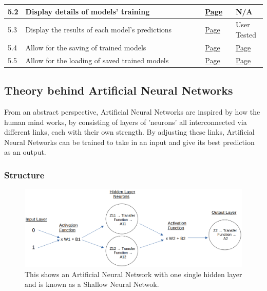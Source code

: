 \documentclass[./project-report/src/latex/project-report.tex]{subfiles}
\begin{document}
\begin{tabular}{|p{0.03\linewidth}|p{0.73\linewidth}|p{0.12\linewidth}|p{0.12\linewidth}|}
      \hline
      5.2 & Display details of models' training & \hyperref[sec:create_model-module]{Page \pageref{sec:create_model-module}} & N/A \\
      \hline
      5.3 & Display the results of each model's predictions & \hyperref[sec:test_model-module]{Page \pageref{sec:test_model-module}} & User Tested \\
      \hline
      5.4 & Allow for the saving of trained models & \hyperref[sec:test_model-module]{Page \pageref{sec:test_model-module}} & \hyperref[sec:test-frames-input-validation]{Page \pageref{sec:test-frames-input-validation}} \\
      \hline
      5.5 & Allow for the loading of saved trained models & \hyperref[sec:load_model-module]{Page \pageref{sec:load_model-module}} & \hyperref[sec:load-model-frame-input-validation]{Page \pageref{sec:load-model-frame-input-validation}} \\
      \hline
\end{tabular}

\subsection{Theory behind Artificial Neural Networks}
\label{sec:ann-theory}

From an abstract perspective, Artificial Neural Networks are inspired by how the human mind works, by consisting of layers of 'neurons' all interconnected via 
different links, each with their own strength. By adjusting these links, Artificial Neural Networks can be trained to take in an input and give its best 
prediction as an output.
\vspace{5mm}

\subsubsection{Structure}

\begin{figure}[h!]
\centering
\includegraphics[width=1\textwidth]{./project-report/src/images/shallow-ann-diagram.png}
\caption{This shows an Artificial Neural Network with one single hidden layer and is known as a Shallow Neural Netwok.}
\end{figure}
\end{document}
